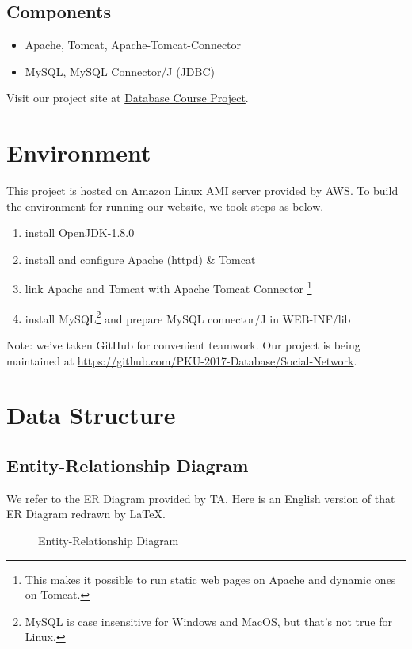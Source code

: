 \subsection{Components}
\begin{itemize}
	\item Apache, Tomcat, Apache-Tomcat-Connector
	\item MySQL, MySQL Connector/J (JDBC)
\end{itemize}

Visit our project site at \href{http://54.250.244.23/database-project/db/main.jsp}{Database Course Project}.

\section{Environment}

This project is hosted on Amazon Linux AMI server provided by AWS. To build the environment for running our website, we took steps as below.

\begin{enumerate}
	\item install OpenJDK-1.8.0
	\item install and configure Apache (httpd) \& Tomcat
	\item link Apache and Tomcat with Apache Tomcat Connector \footnote{This makes it possible to run static web pages on Apache and dynamic ones on Tomcat.}
	\item install MySQL\footnote{MySQL is case insensitive for Windows and MacOS, but that's not true for Linux.} and prepare MySQL connector/J in WEB-INF/lib
\end{enumerate}

Note: we've taken GitHub for convenient teamwork. Our project is being maintained at \url{https://github.com/PKU-2017-Database/Social-Network}.

\section{Data Structure}

\subsection{Entity-Relationship Diagram}

We refer to the ER Diagram provided by TA. Here is an English version of that ER Diagram redrawn by \LaTeX.

\begin{figure}[htbp]
	\begin{center}
		
	\end{center}
	\caption{Entity-Relationship Diagram}
\end{figure}

